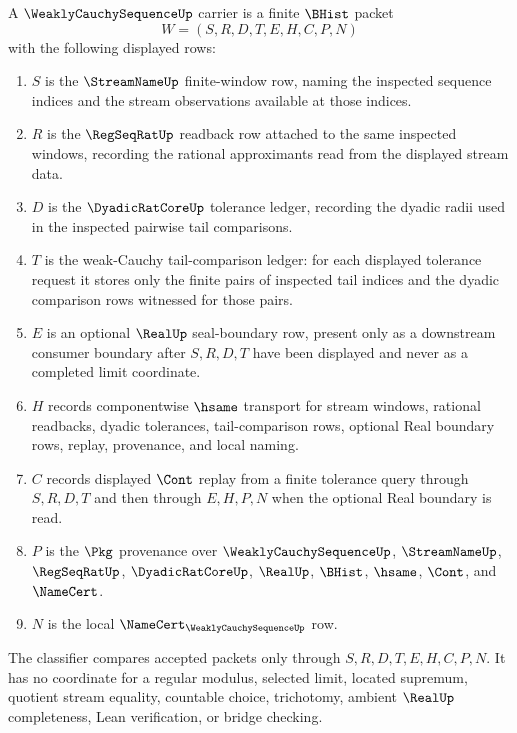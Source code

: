 \begin{definition}
\label{def:weakly-cauchy-sequence-carrier}
A $\WeaklyCauchySequenceUp$ carrier is a finite $\BHist$ packet
$$
W=(S,R,D,T,E,H,C,P,N)
$$
with the following displayed rows:
\begin{enumerate}
\item $S$ is the $\StreamNameUp$ finite-window row, naming the inspected sequence indices and the stream observations available at those indices.
\item $R$ is the $\RegSeqRatUp$ readback row attached to the same inspected windows, recording the rational approximants read from the displayed stream data.
\item $D$ is the $\DyadicRatCoreUp$ tolerance ledger, recording the dyadic radii used in the inspected pairwise tail comparisons.
\item $T$ is the weak-Cauchy tail-comparison ledger: for each displayed tolerance request it stores only the finite pairs of inspected tail indices and the dyadic comparison rows witnessed for those pairs.
\item $E$ is an optional $\RealUp$ seal-boundary row, present only as a downstream consumer boundary after $S,R,D,T$ have been displayed and never as a completed limit coordinate.
\item $H$ records componentwise $\hsame$ transport for stream windows, rational readbacks, dyadic tolerances, tail-comparison rows, optional Real boundary rows, replay, provenance, and local naming.
\item $C$ records displayed $\Cont$ replay from a finite tolerance query through $S,R,D,T$ and then through $E,H,P,N$ when the optional Real boundary is read.
\item $P$ is the $\Pkg$ provenance over $\WeaklyCauchySequenceUp$, $\StreamNameUp$, $\RegSeqRatUp$, $\DyadicRatCoreUp$, $\RealUp$, $\BHist$, $\hsame$, $\Cont$, and $\NameCert$.
\item $N$ is the local $\NameCert_{\WeaklyCauchySequenceUp}$ row.
\end{enumerate}
The classifier compares accepted packets only through $S,R,D,T,E,H,C,P,N$. It has no coordinate for a regular modulus, selected limit, located supremum, quotient stream equality, countable choice, trichotomy, ambient $\RealUp$ completeness, Lean verification, or bridge checking.
\end{definition}

